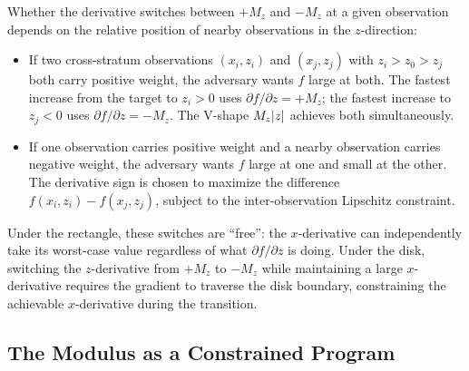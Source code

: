 
Whether the derivative switches between $+M_z$ and $-M_z$ at a given observation depends on the relative position of nearby observations in the $z$-direction:
\begin{itemize}
	\item If two cross-stratum observations $(x_i, z_i)$ and $(x_j, z_j)$ with $z_i > z_0 > z_j$ both carry positive weight, the adversary wants $f$ large at both.
	The fastest increase from the target to $z_i > 0$ uses $\partial f / \partial z = +M_z$; the fastest increase to $z_j < 0$ uses $\partial f / \partial z = -M_z$.
	The V-shape $M_z\lvert z\rvert$ achieves both simultaneously.
	\item If one observation carries positive weight and a nearby observation carries negative weight, the adversary wants $f$ large at one and small at the other.
	The derivative sign is chosen to maximize the difference $f(x_i, z_i) - f(x_j, z_j)$, subject to the inter-observation Lipschitz constraint.
\end{itemize}

Under the rectangle, these switches are ``free'': the $x$-derivative can independently take its worst-case value regardless of what $\partial f / \partial z$ is doing.
Under the disk, switching the $z$-derivative from $+M_z$ to $-M_z$ while maintaining a large $x$-derivative requires the gradient to traverse the disk boundary, constraining the achievable $x$-derivative during the transition.


\subsection{The Modulus as a Constrained Program}\label{app:modulus:program}

